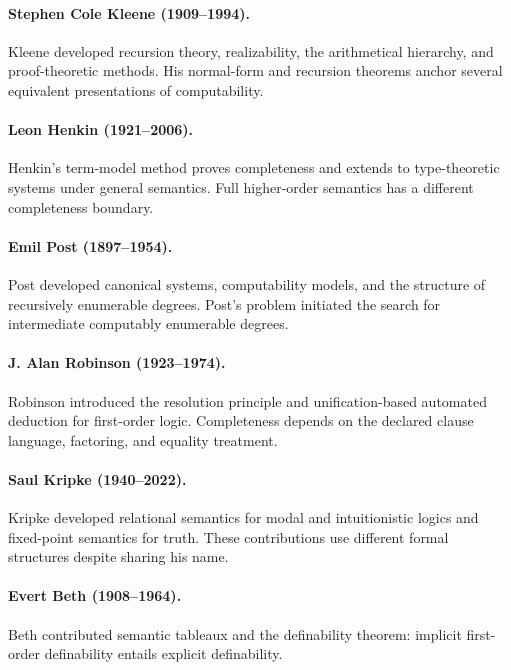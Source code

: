 \paragraph{Stephen Cole Kleene (1909--1994).}
Kleene developed recursion theory, realizability, the arithmetical hierarchy,
and proof-theoretic methods. His normal-form and recursion theorems anchor
several equivalent presentations of computability.

\paragraph{Leon Henkin (1921--2006).}
Henkin's term-model method proves completeness and extends to type-theoretic
systems under general semantics. Full higher-order semantics has a different
completeness boundary.

\paragraph{Emil Post (1897--1954).}
Post developed canonical systems, computability models, and the structure of
recursively enumerable degrees. Post's problem initiated the search for
intermediate computably enumerable degrees.

\paragraph{J. Alan Robinson (1923--1974).}
Robinson introduced the resolution principle and unification-based automated
deduction for first-order logic. Completeness depends on the declared clause
language, factoring, and equality treatment.

\paragraph{Saul Kripke (1940--2022).}
Kripke developed relational semantics for modal and intuitionistic logics and
fixed-point semantics for truth. These contributions use different formal
structures despite sharing his name.

\paragraph{Evert Beth (1908--1964).}
Beth contributed semantic tableaux and the definability theorem: implicit
first-order definability entails explicit definability.

